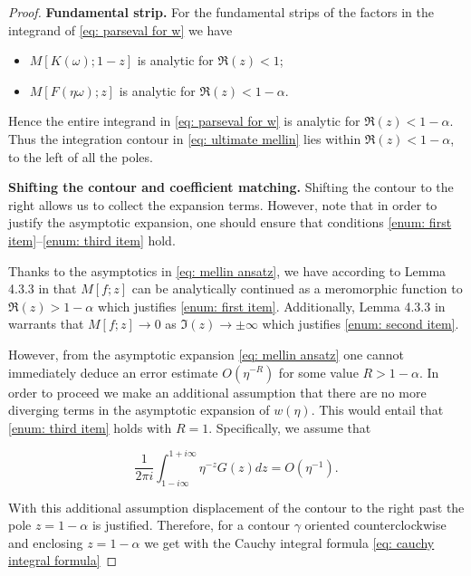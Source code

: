 \documentclass[12pt,twoside]{article}
\theoremstyle{plain}
\theoremstyle{plain}
\theoremstyle{definition}
\theoremstyle{remark}
\numberwithin{equation}{section}
\begin{document}
\begin{proof}
\textbf{Fundamental strip.} For the fundamental strips of the factors in the integrand of \eqref{eq: parseval for w} we have

\begin{itemize}
    \item 
    $M[K(\omega) ; 1-z]$ is analytic for $\Re(z) < 1$;
    \item
    $M[F(\eta \omega) ; z]$ is analytic for $\Re(z)<1-\alpha$.
\end{itemize}

Hence the entire integrand in \eqref{eq: parseval for w} is analytic for $\Re(z)<1-\alpha$. Thus the integration contour in \eqref{eq: ultimate mellin} lies within $\Re (z) < 1 - \alpha$, to the left of all the poles. 

\textbf{Shifting the contour and coefficient matching.} Shifting the contour to the right allows us to collect the expansion terms. However, note that in order to justify the asymptotic expansion, one should ensure that conditions \eqref{enum: first item}–\eqref{enum: third item} hold.

Thanks to the asymptotics in \eqref{eq: mellin ansatz}, we have according to Lemma 4.3.3 in \cite{BH75} that $M[f;z]$ can be analytically continued as a meromorphic function to $\Re(z)>1-\alpha$ which justifies \eqref{enum: first item}. Additionally, Lemma 4.3.3 in \cite{BH75} warrants that $M[f;z]\rightarrow 0$ as $\Im(z)\rightarrow \pm \infty$ which justifies \eqref{enum: second item}.

However, from the asymptotic expansion \eqref{eq: mellin ansatz} one cannot immediately deduce an error estimate $O(\eta^{-R})$ for some value $R>1-\alpha$. In order to proceed we make an additional assumption that there are no more diverging terms in the asymptotic expansion of $w(\eta)$. This would entail that \eqref{enum: third item} holds with $R=1$. Specifically, we assume that

\begin{equation}
\label{eq: O(1) assumption}
\frac{1}{2 \pi i} \int_{1-i \infty}^{1+i \infty} \eta^{-z} G(z) d z=O\left(\eta^{-1}\right).
\end{equation}

\vspace{5pt}

With this additional assumption displacement of the contour to the right past the pole $z=1-\alpha$ is justified. Therefore, for a contour $\gamma$ oriented counterclockwise and enclosing $z=1-\alpha$ we get with the Cauchy integral formula \eqref{eq: cauchy integral formula}


\end{proof}
\end{document}
